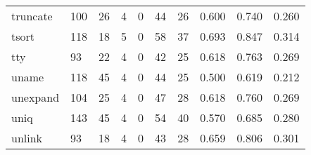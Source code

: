 \begin{longtable}{lp{1.3cm}p{1.3cm}p{1.3cm}p{1.3cm}p{1.3cm}p{1.3cm}p{1.3cm}p{1.3cm}p{1.3cm}}
truncate  &                    100 &                                 26 &                                 4 &                                0 &                                44 &                              26 &                                0.600 &                                  0.740 &                                0.260 \\
tsort     &                    118 &                                 18 &                                 5 &                                0 &                                58 &                              37 &                                0.693 &                                  0.847 &                                0.314 \\
tty       &                     93 &                                 22 &                                 4 &                                0 &                                42 &                              25 &                                0.618 &                                  0.763 &                                0.269 \\
uname     &                    118 &                                 45 &                                 4 &                                0 &                                44 &                              25 &                                0.500 &                                  0.619 &                                0.212 \\
unexpand  &                    104 &                                 25 &                                 4 &                                0 &                                47 &                              28 &                                0.618 &                                  0.760 &                                0.269 \\
uniq      &                    143 &                                 45 &                                 4 &                                0 &                                54 &                              40 &                                0.570 &                                  0.685 &                                0.280 \\
unlink    &                     93 &                                 18 &                                 4 &                                0 &                                43 &                              28 &                                0.659 &                                  0.806 &                                0.301 \\

\end{longtable}
